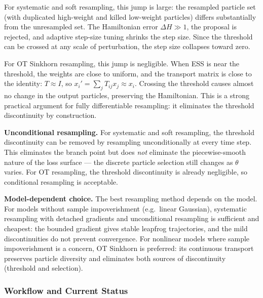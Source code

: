\documentclass{article}
\begin{document}
For systematic and soft resampling, this jump is large: the resampled particle set (with duplicated high-weight and killed low-weight particles) differs substantially from the unresampled set. The Hamiltonian error $\Delta H \gg 1$, the proposal is rejected, and adaptive step-size tuning shrinks the step size. Since the threshold can be crossed at any scale of perturbation, the step size collapses toward zero.

For OT Sinkhorn resampling, this jump is negligible. When ESS is near the threshold, the weights are close to uniform, and the transport matrix is close to the identity: $T \approx I$, so $x_i' = \sum_j T_{ij} x_j \approx x_i$. Crossing the threshold causes almost no change in the output particles, preserving the Hamiltonian. This is a strong practical argument for fully differentiable resampling: it eliminates the threshold discontinuity by construction.

\textbf{Unconditional resampling.} For systematic and soft resampling, the threshold discontinuity can be removed by resampling unconditionally at every time step. This eliminates the branch point but does \textit{not} eliminate the piecewise-smooth nature of the loss surface --- the discrete particle selection still changes as $\theta$ varies. For OT resampling, the threshold discontinuity is already negligible, so conditional resampling is acceptable.

\textbf{Model-dependent choice.} The best resampling method depends on the model. For models without sample impoverishment (e.g.\ linear Gaussian), systematic resampling with detached gradients and unconditional resampling is sufficient and cheapest: the bounded gradient gives stable leapfrog trajectories, and the mild discontinuities do not prevent convergence. For nonlinear models where sample impoverishment is a concern, OT Sinkhorn is preferred: its continuous transport preserves particle diversity and eliminates both sources of discontinuity (threshold and selection).




\subsubsection{Workflow and Current Status}
\end{document}
